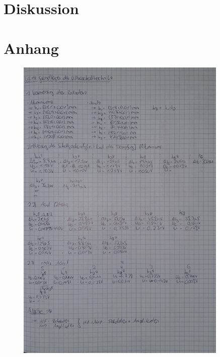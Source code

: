 


\section{Diskussion}
\label{sec:Diskussion}

\section{Anhang}

\begin{figure}
    \centering
    \includegraphics[width=0.9\textwidth]{Laborbuch1.jpg}
\end{figure}

